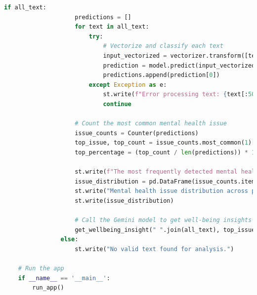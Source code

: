         \begin{tcolorbox}[colback=gray!5!white, colframe=gray!80!black, boxrule=0.5pt, title=Streamlit Mental Health Disorder Detection App]        
            \begin{lstlisting}[language=Python]
                if all_text:
                    predictions = []
                    for text in all_text:
                        try:
                            # Vectorize and classify each text
                            input_vectorized = vectorizer.transform([text])
                            prediction = model.predict(input_vectorized)
                            predictions.append(prediction[0])
                        except Exception as e:
                            st.write(f"Error processing text: {text[:50]}... - {e}")
                            continue
    
                    # Count the most common mental health issue
                    issue_counts = Counter(predictions)
                    top_issue, top_count = issue_counts.most_common(1)[0]
                    top_percentage = (top_count / len(predictions)) * 100
    
                    st.write(f"The most frequently detected mental health concern is: {top_issue}, appearing in {top_percentage:.2f}% of analyzed text.")
                    issue_distribution = pd.DataFrame(issue_counts.items(), columns=['Mental Health Issue', 'Count'])
                    st.write("Mental health issue distribution across posts:")
                    st.write(issue_distribution)
    
                    # Call the Gemini model to get well-being insights
                    get_wellbeing_insight(" ".join(all_text), top_issue)
                else:
                    st.write("No valid text found for analysis.")

    # Run the app
    if __name__ == '__main__':
        run_app()
    \end{lstlisting}
    \end{tcolorbox}

